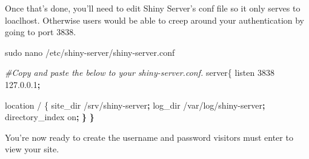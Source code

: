 \documentclass[
]{book}
\newenvironment{Shaded}{\begin{snugshade}}{\end{snugshade}}
\newcommand{\CommentTok}[1]{\textcolor[rgb]{0.56,0.35,0.01}{\textit{#1}}}
\newcommand{\ErrorTok}[1]{\textcolor[rgb]{0.64,0.00,0.00}{\textbf{#1}}}
\newcommand{\ExtensionTok}[1]{#1}
\newcommand{\FunctionTok}[1]{\textcolor[rgb]{0.00,0.00,0.00}{#1}}
\newcommand{\KeywordTok}[1]{\textcolor[rgb]{0.13,0.29,0.53}{\textbf{#1}}}
\newcommand{\NormalTok}[1]{#1}
\newcommand{\StringTok}[1]{\textcolor[rgb]{0.31,0.60,0.02}{#1}}
\newcommand{\VariableTok}[1]{\textcolor[rgb]{0.00,0.00,0.00}{#1}}
\begin{document}
\begin{Shaded}
\end{Shaded}

Once that's done, you'll need to edit Shiny Server's conf file so it only serves to loaclhost. Otherwise users would be able to creep around your authentication by going to port 3838.

\begin{Shaded}
\begin{Highlighting}[]
\FunctionTok{sudo}\NormalTok{ nano /etc/shiny{-}server/shiny{-}server.conf}

\CommentTok{\#Copy and paste the below to your shiny{-}server.conf.}
\ExtensionTok{server\{}
    \ExtensionTok{listen}\NormalTok{ 3838 127.0.0.1}\KeywordTok{;}
    
    \ExtensionTok{location}\NormalTok{ / \{}
    \ExtensionTok{site\_dir}\NormalTok{ /srv/shiny{-}server}\KeywordTok{;}
    \ExtensionTok{log\_dir}\NormalTok{ /var/log/shiny{-}server}\KeywordTok{;}
    \ExtensionTok{directory\_index}\NormalTok{ on}\KeywordTok{;}
    \ErrorTok{\}}
\ErrorTok{\}}
\end{Highlighting}
\end{Shaded}

You're now ready to create the username and password visitors must enter to view your site.
\end{document}
